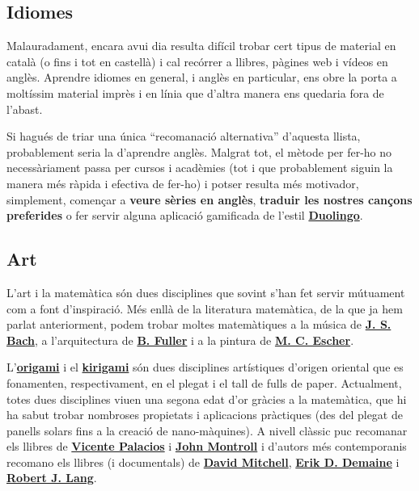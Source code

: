 \documentclass[a4paper, 12pt]{article}
\begin{document}
        \subsection*{Idiomes}

            Malauradament, encara avui dia resulta difícil trobar cert tipus de material en català (o fins i tot en castellà) i cal recórrer a llibres, pàgines web i vídeos en anglès. Aprendre idiomes en general, i anglès en particular, ens obre la porta a moltíssim material imprès i en línia que d'altra manera ens quedaria fora de l'abast.

            Si hagués de triar una única ``recomanació alternativa'' d'aquesta llista, probablement seria la d'aprendre anglès. Malgrat tot, el mètode per fer-ho no necessàriament passa per cursos i acadèmies (tot i que probablement siguin la manera més ràpida i efectiva de fer-ho) i potser resulta més motivador, simplement, començar a \textbf{veure sèries en anglès}, \textbf{traduir les nostres cançons preferides} o fer servir alguna aplicació gamificada de l'estil \href{https://play.google.com/store/apps/details?id=com.duolingo}{\textbf{Duolingo}}.

        \subsection*{Art}

            L'art i la matemàtica són dues disciplines que sovint s'han fet servir mútuament com a font d'inspiració. Més enllà de la literatura matemàtica, de la que ja hem parlat anteriorment, podem trobar moltes matemàtiques a la música de \href{https://ca.wikipedia.org/wiki/Johann_Sebastian_Bach}{\textbf{J. S. Bach}}, a l'arquitectura de \href{https://ca.wikipedia.org/wiki/Buckminster_Fuller}{\textbf{B. Fuller}} i a la pintura de \href{https://ca.wikipedia.org/wiki/Maurits_Cornelis_Escher}{\textbf{M. C. Escher}}.

            L'\href{https://ca.wikipedia.org/wiki/Origami}{\textbf{origami}} i el \href{https://en.wikipedia.org/wiki/Kirigami}{\textbf{kirigami}} són dues disciplines artístiques d'origen oriental que es fonamenten, respectivament, en el plegat i el tall de fulls de paper. Actualment, totes dues disciplines viuen una segona edat d'or gràcies a la matemàtica, que hi ha sabut trobar nombroses propietats i aplicacions pràctiques (des del plegat de panells solars fins a la creació de nano-màquines). A nivell clàssic puc recomanar els llibres de \href{https://www.casadellibro.com/libros-ebooks/vicente-palacios/60484}{\textbf{Vicente Palacios}} i \href{https://en.wikipedia.org/wiki/John_Montroll}{\textbf{John Montroll}} i d'autors més contemporanis recomano els llibres (i documentals) de \href{http://www.origamiheaven.com/}{\textbf{David Mitchell}}, \href{https://en.wikipedia.org/wiki/Erik_Demaine}{\textbf{Erik D. Demaine}} i \href{https://en.wikipedia.org/wiki/Robert_J._Lang}{\textbf{Robert J. Lang}}.
\end{document}

